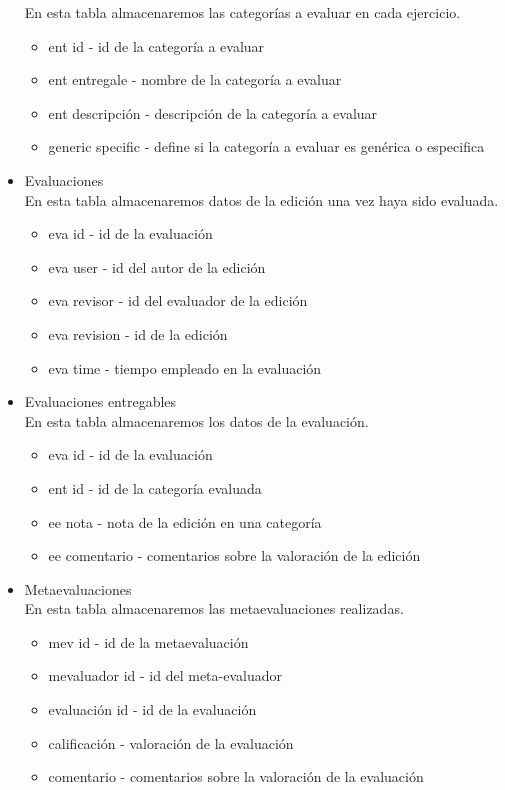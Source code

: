 \begin{itemize}
	En esta tabla almacenaremos las categorías a evaluar en cada ejercicio.
	
	\begin{itemize}
		\item ent id - id de la categoría a evaluar
		\item ent entregale - nombre de la categoría a evaluar
		\item ent descripción - descripción de la categoría a evaluar
		\item generic specific - define si la categoría a evaluar es genérica o especifica
	\end{itemize}
	
	\item Evaluaciones\\
	
	En esta tabla almacenaremos datos de la edición una vez haya sido evaluada.
	
	\begin{itemize}
		\item eva id - id de la evaluación
		\item eva user - id del autor de la edición
		\item eva revisor - id del evaluador de la edición
		\item eva revision - id de la edición
		\item eva time - tiempo empleado en la evaluación
	\end{itemize}
	
	\item Evaluaciones entregables\\
	
	En esta tabla almacenaremos los datos de la evaluación.
	
	\begin{itemize}
		\item eva id - id de la evaluación
		\item ent id - id de la categoría evaluada
		\item ee nota - nota de la edición en una categoría
		\item ee comentario - comentarios sobre la valoración de la edición
	\end{itemize}
	
	\item Metaevaluaciones\\
	
	En esta tabla almacenaremos las metaevaluaciones realizadas.
	
	\begin{itemize}
		\item mev id - id de la metaevaluación
		\item mevaluador id - id del meta-evaluador
		\item evaluación id - id de la evaluación
		\item calificación - valoración de la evaluación
		\item comentario - comentarios sobre la valoración de la evaluación
	\end{itemize}
	

\end{itemize}
